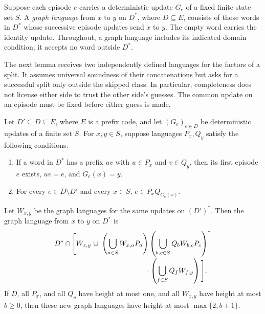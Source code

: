 Suppose each episode $e$ carries a deterministic update $G_e$ of a
fixed finite state set $S$. A \emph{graph language} from $x$ to $y$ on
$D^*$, where $D\subseteq E$, consists of those words in $D^*$ whose
successive episode updates send $x$ to $y$. The empty word carries the
identity update. Throughout, a graph language includes its indicated
domain condition; it accepts no word outside $D^*$.

The next lemma receives two independently defined languages for the factors
of a split. It assumes universal soundness of their concatenations but asks
for a successful split only outside the skipped class. In particular,
completeness does not license either side to trust the other side's guesses.
The common update on an episode must be fixed before either guess is made.

\begin{lemma}\label{lem:split}
Let $D'\subseteq D\subseteq E$, where $E$ is a prefix code, and let
$(G_e)_{e\in D}$ be deterministic updates of a finite set $S$.
For $x,y\in S$, suppose languages $P_x,Q_y$ satisfy the following
conditions.
\begin{enumerate}[label=\textup{(\roman*)}]
 \item If a word in $D^*$ has a prefix $uv$ with $u\in P_x$ and
 $v\in Q_y$, then its first episode $e$ exists, $uv=e$, and
 $G_e(x)=y$.
 \item For every $e\in D\setminus D'$ and every $x\in S$,
 $e\in P_xQ_{G_e(x)}$.
\end{enumerate}
Let $W_{x,y}$ be the graph languages for the same updates on $(D')^*$.
Then the graph language from $x$ to $y$ on $D^*$ is
\begin{equation}\label{eq:split-expression}
\begin{split}
D^*\cap\Bigg[W_{x,y}\ \cup\ &
 \left(\bigcup_{a\in S}W_{x,a}P_a\right)
 \left(\bigcup_{b,c\in S}Q_bW_{b,c}P_c\right)^*\\[-2pt]
 &\hspace{22mm}\cdot
 \left(\bigcup_{f\in S}Q_fW_{f,y}\right)\Bigg].
\end{split}
\end{equation}
If $D$, all $P_x$, and all $Q_y$ have height at most one, and all
$W_{x,y}$ have height at most $b\ge0$, then these new graph languages
have height at most $\max\{2,b+1\}$.
\end{lemma}

